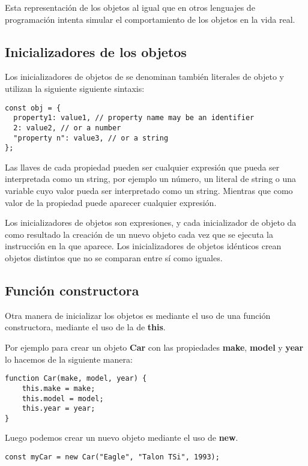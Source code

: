 \documentclass{article}
\begin{document}
Esta representación de los objetos al igual que en otros lenguajes de programación intenta simular el comportamiento
de los objetos en la vida real.

\subsection*{Inicializadores de los objetos}

Los inicializadores de objetos de se denominan también literales de objeto y utilizan la siguiente siguiente sintaxis:

\begin{lstlisting}
const obj = {
  property1: value1, // property name may be an identifier
  2: value2, // or a number
  "property n": value3, // or a string
};
\end{lstlisting}

Las llaves de cada propiedad pueden ser cualquier expresión que pueda ser interpretada como un string,
por ejemplo un número, un literal de string o una variable cuyo valor pueda ser interpretado como un string.
Mientras que como valor de la propiedad puede aparecer cualquier expresión.

Los inicializadores de objetos son expresiones, y cada inicializador de
objeto da como resultado la creación de un nuevo objeto cada vez que se
ejecuta la instrucción en la que aparece. Los inicializadores de objetos idénticos crean objetos distintos que no se comparan entre sí como iguales.

\subsection*{Función constructora}

Otra manera de inicializar los objetos es mediante el uso de una función constructora, mediante el uso de la
de \textbf{this}.

Por ejemplo para crear un objeto \textbf{Car} con las propiedades \textbf{make}, \textbf{model} y \textbf{year}
lo hacemos de la siguiente manera:

\begin{lstlisting}
function Car(make, model, year) {
    this.make = make;
    this.model = model;
    this.year = year;
}
\end{lstlisting}

Luego podemos crear un nuevo objeto mediante el uso de \textbf{new}.

\begin{lstlisting}
const myCar = new Car("Eagle", "Talon TSi", 1993);
\end{lstlisting}
\end{document}
